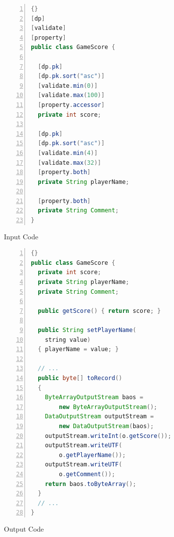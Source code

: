 \begin{figure}[ht]
\begin{minipage}[t]{0.5\linewidth}
\begin{center}
\begin{scriptsize}
\begin{lstlisting}[numbers=left,language=Java,frame=leftline]{}
[dp]
[validate]
[property]
public class GameScore {

  [dp.pk]
  [dp.pk.sort("asc")]
  [validate.min(0)]
  [validate.max(100)]
  [property.accessor]
  private int score;

  [dp.pk]
  [dp.pk.sort("asc")]
  [validate.min(4)]
  [validate.max(32)]
  [property.both]
  private String playerName;

  [property.both]
  private String Comment;
}
\end{lstlisting}
\vspace{1.75cm}
\end{scriptsize}
\end{center}
\caption{Input Code}
\label{fig:input}
\end{minipage}%
\begin{minipage}[t]{0.5\linewidth}
\begin{center}
\begin{scriptsize}
	\begin{lstlisting}[numbers=left,language=Java,frame=leftline]{}
public class GameScore {
  private int score;
  private String playerName;
  private String Comment;

  public getScore() { return score; }
	
  public String setPlayerName(
    string value)
  { playerName = value; }
	
  // ...
  public byte[] toRecord()
  {
    ByteArrayOutputStream baos =
        new ByteArrayOutputStream();
    DataOutputStream outputStream =
        new DataOutputStream(baos);
    outputStream.writeInt(o.getScore());
    outputStream.writeUTF(
        o.getPlayerName());
    outputStream.writeUTF(
        o.getComment());
    return baos.toByteArray();
  }
  // ...
}
\end{lstlisting}
\end{scriptsize}
\end{center}
\caption{Output Code}
\label{fig:output}
\end{minipage}
\end{figure}

